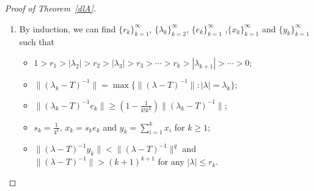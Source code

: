 \documentclass[12pt]{amsart}
\numberwithin{equation}{section}
\theoremstyle{plain}
\theoremstyle{definition}
\begin{document}
\begin{proof}[Proof of Theorem~\ref{dlA}]
\begin{enumerate}
  \item [(5)]
  By induction, we can find $\{r_k\}_{k=1}^{\infty}$, $\{\lambda_k\}_{k=2}^{\infty}$, $\{e_k\}_{k=1}^{\infty}$ ,$\{x_k\}_{k=1}^{\infty}$ and $\{y_k\}_{k=1}^{\infty}$ such that
\begin{itemize}
  \item [(a)]
  $1>r_1>|\lambda_2|>r_2>|\lambda_3|>r_3>\cdots>r_k>|\lambda_{k+1}|>\cdots>0$;
  \item [(b)]
  $\|(\lambda_k-T)^{-1}\|=\max\{\|(\lambda-T)^{-1}\|:|\lambda|=\lambda_k\}$;
  \item [(c)]
  $\|(\lambda_k-T)^{-1}e_k\|\geq(1-\frac{1}{k!k^k})\|(\lambda_k-T)^{-1}\|$;
  \item [(d)]
  $s_k=\frac{1}{4^k}$, $x_k=s_k e_k$ and $y_k=\sum_{i=1}^{k}x_i$ for
  $k\geq 1$;
  \item [(f)]
  $\|(\lambda-T)^{-1}y_k\|<\|(\lambda-T)^{-1}\|^q$ and  $\|(\lambda-T)^{-1}\|>(k+1)^{k+1}$ for any $|\lambda|\leq r_k$.
\end{itemize}
\end{enumerate}



\end{proof}
\end{document}
